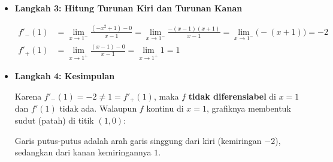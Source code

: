 \documentclass[10pt,a4paper]{article}
\newcounter{eqblock}
\newcommand{\reseteq}{%
  \stepcounter{eqblock}%
  \setcounter{equation}{0}%
  \renewcommand{\theHequation}{\arabic{eqblock}.\arabic{equation}}%
}
\begin{document}
\begin{enumerate}
\begin{itemize}
\reseteq
\begin{align}
\lim_{x \to 1^-} f(x) &= \lim_{x \to 1^-} (-x^2 + 1) = -1 + 1 = 0 \quad \text{(Aturan untuk $x < 1$)} \\
\lim_{x \to 1^+} f(x) &= \lim_{x \to 1^+} (x - 1) = 1 - 1 = 0 \quad \text{(Aturan untuk $x > 1$)}
\end{align}
Karena $\lim_{x \to 1^-} f(x) = \lim_{x \to 1^+} f(x) = f(1) = 0$, maka $f$ kontinu di $x = 1$.

\item \textbf{Langkah 3: Hitung Turunan Kiri dan Turunan Kanan}

\reseteq
\begin{align}
f'_-(1) &= \lim_{x \to 1^-} \frac{(-x^2 + 1) - 0}{x - 1} = \lim_{x \to 1^-} \frac{-(x - 1)(x + 1)}{x - 1} = \lim_{x \to 1^-} \bigl(-(x + 1)\bigr) = -2 \\
f'_+(1) &= \lim_{x \to 1^+} \frac{(x - 1) - 0}{x - 1} = \lim_{x \to 1^+} 1 = 1
\end{align}

\item \textbf{Langkah 4: Kesimpulan}

Karena $f'_-(1) = -2 \neq 1 = f'_+(1)$, maka $f$ \textbf{tidak diferensiabel} di $x = 1$ dan $f'(1)$ tidak ada.
Walaupun $f$ kontinu di $x = 1$, grafiknya membentuk sudut (patah) di titik $(1, 0)$:

\begin{center}
\end{center}
Garis putus-putus adalah arah garis singgung dari kiri (kemiringan $-2$), sedangkan dari kanan kemiringannya $1$.
\end{itemize}


\end{enumerate}
\end{document}
